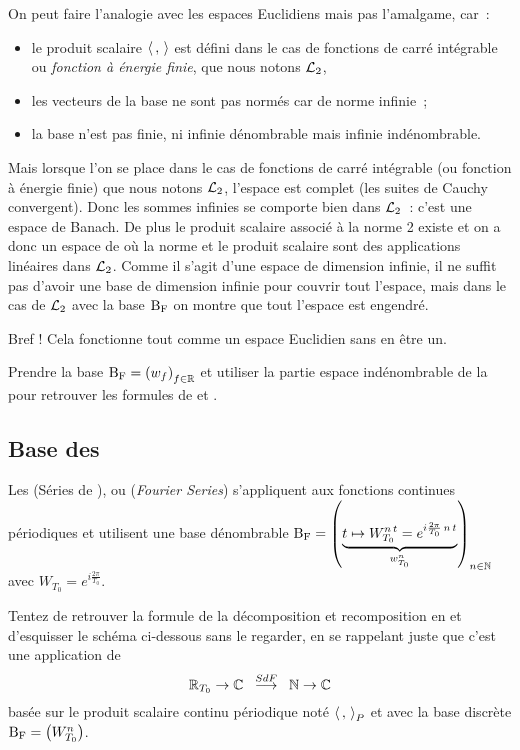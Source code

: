 
On peut faire l'analogie avec les espaces Euclidiens mais pas
l'amalgame, car~:
\begin{itemize}
\item le produit scalaire $\langle\,,\,\rangle$ est défini dans le cas de
  fonctions de carré intégrable ou \emph{fonction à énergie finie},
  que nous notons $\mathcal{L}_{2}$,
\item les vecteurs de la base ne sont pas normés car de norme
  infinie~;
\item la base n'est pas finie, ni infinie dénombrable mais infinie
  indénombrable.
\end{itemize}

Mais lorsque l'on se place dans le cas de fonctions de carré
intégrable (ou fonction à énergie finie) que nous notons $\mathcal{L}_{2}$,
l'espace est complet (les suites de Cauchy convergent). Donc les sommes
infinies se comporte bien dans $\mathcal{L}_{2}$~: c'est une espace de
Banach. De plus le produit scalaire associé à la norme 2 existe et on
a donc un espace de \Hilbert{} où la norme et le produit scalaire sont
des applications linéaires dans $\mathcal{L}_{2}$. Comme il s'agit d'une
espace de dimension infinie, il ne suffit pas d'avoir une base de
dimension infinie pour couvrir tout l'espace, mais dans le cas de
$\mathcal{L}_{2}$ avec la base $\mathrm{B_F}$ on montre que tout l'espace est engendré.

Bref ! Cela fonctionne tout comme un espace Euclidien sans en être un.

\begin{exercice}
  Prendre la base $\mathrm{B_F}=\left(w_f\right)_{f\in\mathbb{R}}$ et utiliser la partie espace
  indénombrable de la  pour retrouver les formules
  de \Plancherel{} et \Parseval.
\end{exercice}


\subsection{Base des \sdf}
Les \sdf{} (Séries de \Fourier), ou \FS{} (\emph{Fourier Series})
s'appliquent aux fonctions continues périodiques et utilisent une base
dénombrable
$\mathrm{B_F}=\left(\underbrace{t\mapsto W_{T_0}^{n\,t}=e^{i \frac{2
        \pi}{T_0}\,n\,t}}_{w_{T_0}^n}\right)_{n\in\mathbb{N}}$ avec
$W_{T_0}=e^{i \frac{2 \pi}{T_0}}$.
\begin{exercice}
  Tentez de retrouver la formule de la décomposition et recomposition
  en \sdf{} et d'esquisser le schéma ci-dessous sans le regarder, en
  se rappelant juste que c'est une application
  de $$\RT0\rightarrow\C\;\;\operateur{\sdf}\;\;\N\rightarrow\C$$
  basée sur le produit scalaire continu périodique noté $\langle\,,\,{\rangle}_P$
  et avec la base discrète $\mathrm{B_F}=\left(W_{T_0}^n\right)$.
\end{exercice}

